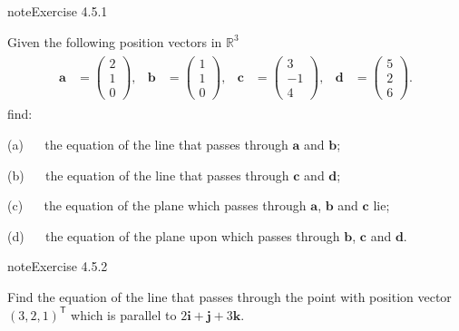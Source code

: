 \documentclass[letterpaper,10pt,english]{jupyterBook}
\begin{document}
\begin{sphinxadmonition}{note}{Exercise 4.5.1}



\sphinxAtStartPar
Given the following position vectors in \(\mathbb{R}^3\)
\begin{equation*}
\begin{split} \begin{align*} 
    \mathbf{a} &= \begin{pmatrix} 2 \\ 1 \\ 0 \end{pmatrix}, &
    \mathbf{b} &= \begin{pmatrix} 1 \\ 1 \\ 0 \end{pmatrix}, &
    \mathbf{c} &= \begin{pmatrix} 3 \\ -1 \\ 4 \end{pmatrix}, &
    \mathbf{d} &= \begin{pmatrix} 5 \\ 2 \\ 6 \end{pmatrix}.
\end{align*} \end{split}
\end{equation*}
\sphinxAtStartPar
find:

\sphinxAtStartPar
(a)   the equation of the line that passes through \(\mathbf{a}\) and \(\mathbf{b}\);

\sphinxAtStartPar
(b)   the equation of the line that passes through \(\mathbf{c}\) and \(\mathbf{d}\);

\sphinxAtStartPar
(c)   the equation of the plane which passes through \(\mathbf{a}\), \(\mathbf{b}\) and \(\mathbf{c}\) lie;

\sphinxAtStartPar
(d)   the equation of the plane upon which passes through \(\mathbf{b}\), \(\mathbf{c}\) and \(\mathbf{d}\).
\end{sphinxadmonition}
 \label{exercise:geometry-ex-line-equation-1}

\begin{sphinxadmonition}{note}{Exercise 4.5.2}



\sphinxAtStartPar
Find the equation of the line that passes through the point with position vector \((3, 2, 1)^\mathsf{T}\) which is parallel to \(2 \mathbf{i} + \mathbf{j} + 3 \mathbf{k}\).
\end{sphinxadmonition}
 \label{exercise:geometry-ex-plane-equation-1}
\end{document}

